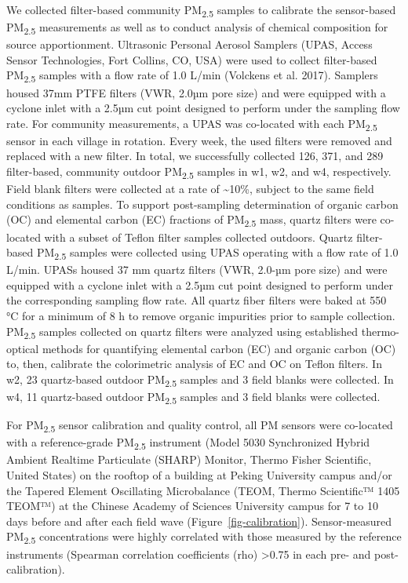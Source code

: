 \documentclass[
  letterpaper,
  DIV=11,
  numbers=noendperiod]{scrartcl}
\begin{document}
We collected filter-based community PM\textsubscript{2.5} samples to
calibrate the sensor-based PM\textsubscript{2.5} measurements as well as
to conduct analysis of chemical composition for source apportionment.
Ultrasonic Personal Aerosol Samplers (UPAS, Access Sensor Technologies,
Fort Collins, CO, USA) were used to collect filter-based
PM\textsubscript{2.5} samples with a flow rate of 1.0 L/min (Volckens et
al. 2017). Samplers housed 37mm PTFE filters (VWR, 2.0µm pore size) and
were equipped with a cyclone inlet with a 2.5µm cut point designed to
perform under the sampling flow rate. For community measurements, a UPAS
was co-located with each PM\textsubscript{2.5} sensor in each village in
rotation. Every week, the used filters were removed and replaced with a
new filter. In total, we successfully collected 126, 371, and 289
filter-based, community outdoor PM\textsubscript{2.5} samples in w1, w2,
and w4, respectively. Field blank filters were collected at a rate of
\textasciitilde10\%, subject to the same field conditions as samples. To
support post-sampling determination of organic carbon (OC) and elemental
carbon (EC) fractions of PM\textsubscript{2.5} mass, quartz filters were
co-located with a subset of Teflon filter samples collected outdoors.
Quartz filter-based PM\textsubscript{2.5} samples were collected using
UPAS operating with a flow rate of 1.0 L/min. UPASs housed 37 mm quartz
filters (VWR, 2.0-µm pore size) and were equipped with a cyclone inlet
with a 2.5µm cut point designed to perform under the corresponding
sampling flow rate. All quartz fiber filters were baked at 550 °C for a
minimum of 8 h to remove organic impurities prior to sample collection.
PM\textsubscript{2.5} samples collected on quartz filters were analyzed
using established thermo-optical methods for quantifying elemental
carbon (EC) and organic carbon (OC) to, then, calibrate the colorimetric
analysis of EC and OC on Teflon filters. In w2, 23 quartz-based outdoor
PM\textsubscript{2.5} samples and 3 field blanks were collected. In w4,
11 quartz-based outdoor PM\textsubscript{2.5} samples and 3 field blanks
were collected.

For PM\textsubscript{2.5} sensor calibration and quality control, all PM
sensors were co-located with a reference-grade PM\textsubscript{2.5}
instrument (Model 5030 Synchronized Hybrid Ambient Realtime Particulate
(SHARP) Monitor, Thermo Fisher Scientific, United States) on the rooftop
of a building at Peking University campus and/or the Tapered Element
Oscillating Microbalance (TEOM, Thermo Scientific™ 1405 TEOM™) at the
Chinese Academy of Sciences University campus for 7 to 10 days before
and after each field wave (Figure~\ref{fig-calibration}).
Sensor-measured PM\textsubscript{2.5} concentrations were highly
correlated with those measured by the reference instruments (Spearman
correlation coefficients (rho) \textgreater0.75 in each pre- and
post-calibration).
\end{document}
